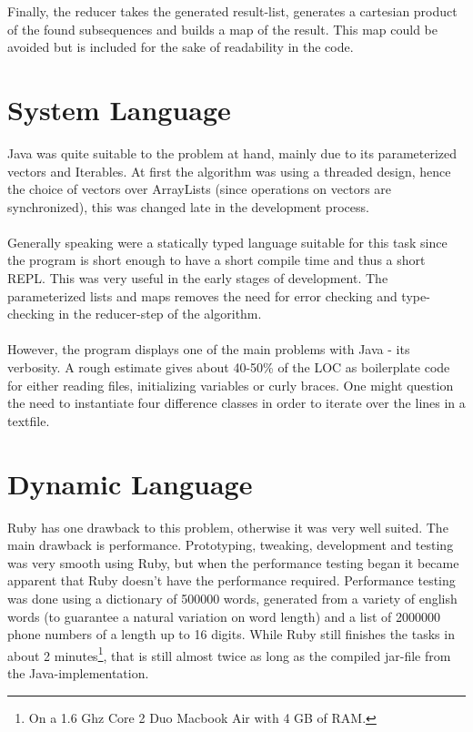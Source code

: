 \documentclass[a4paper,10pt]{article}
\begin{document}
Finally, the reducer takes the generated result-list, generates a cartesian product of the found subsequences and builds a map of the result. This map could be avoided but is included for the sake of readability in the code.

\section{System Language}
Java was quite suitable to the problem at hand, mainly due to its parameterized vectors and Iterables. At first the algorithm was using a threaded design, hence the choice of vectors over ArrayLists (since operations on vectors are synchronized), this was changed late in the development process.
\paragraph{}
Generally speaking were a statically typed language suitable for this task since the program is short enough to have a short compile time and thus a short REPL. This was very useful in the early stages of development. The parameterized lists and maps removes the need for error checking and type-checking in the reducer-step of the algorithm. 
\paragraph{}
However, the program displays one of the main problems with Java - its verbosity. A rough estimate gives about 40-50\% of the LOC as boilerplate code for either reading files, initializing variables or curly braces. One might question the need to instantiate four difference classes in order to iterate over the lines in a textfile. 

\section{Dynamic Language}
Ruby has one drawback to this problem, otherwise it was very well suited. The main drawback is performance. Prototyping, tweaking, development and testing was very smooth using Ruby, but when the performance testing began it became apparent that Ruby doesn't have the performance required. Performance testing was done using a dictionary of 500000 words, generated from a variety of english words (to guarantee a natural variation on word length) and a list of 2000000 phone numbers of a length up to 16 digits. While Ruby still finishes the tasks in about 2 minutes\footnote{On a 1.6 Ghz Core 2 Duo Macbook Air with 4 GB of RAM.}, that is still almost twice as long as the compiled jar-file from the Java-implementation.
\end{document}
